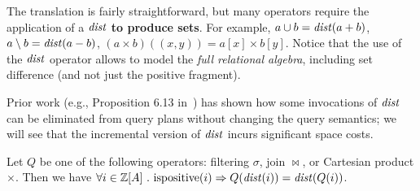 The translation is fairly straightforward, but many operators require
the application of a $\mathit{dist}$ \textbf{to produce sets}.
For example, $a \cup b = \mathit{dist}(a + b)$, $a \setminus b =
\mathit{dist}(a - b)$, $(a \times b)((x,y)) = a[x] \times b[y]$.
%
%
%
%
%
%
%
Notice that the use of the $\mathit{dist}$ operator allows \dbsp to model
the \emph{full relational algebra}, including set difference (and not
just the positive fragment).

Prior work (e.g., Proposition 6.13 in~\cite{green-tcs11}) has shown
how some invocations of $\mathit{dist}$ can be eliminated from query plans
without changing the query semantics; we will see that the incremental
version of $\mathit{dist}$ incurs significant space costs.

\begin{proposition}\label{prop-distinct-delay}
Let $Q$ be one of the following \zrs operators: filtering $\sigma$,
join $\bowtie$, or Cartesian product $\times$.
Then we have $\forall i \in \mathbb{Z}[A]~.~\mbox{ispositive}(i) \Rightarrow Q(\mathit{dist}(i)) = \mathit{dist}(Q(i))$.
\end{proposition}


